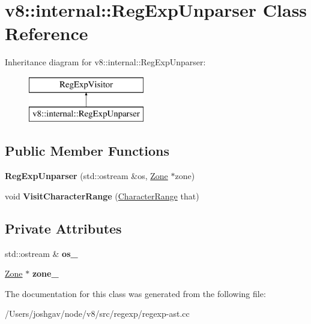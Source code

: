 \hypertarget{classv8_1_1internal_1_1_reg_exp_unparser}{}\section{v8\+:\+:internal\+:\+:Reg\+Exp\+Unparser Class Reference}
\label{classv8_1_1internal_1_1_reg_exp_unparser}
Inheritance diagram for v8\+:\+:internal\+:\+:Reg\+Exp\+Unparser\+:\begin{figure}[H]
\begin{center}
\leavevmode
\includegraphics[height=2.000000cm]{classv8_1_1internal_1_1_reg_exp_unparser}
\end{center}
\end{figure}
\subsection*{Public Member Functions}
\begin{DoxyCompactItemize}
\item 
{\bfseries Reg\+Exp\+Unparser} (std\+::ostream \&os, \hyperlink{classv8_1_1internal_1_1_zone}{Zone} $\ast$zone)\hypertarget{classv8_1_1internal_1_1_reg_exp_unparser_a173b4c3a192299699a7b990d77331078}{}\label{classv8_1_1internal_1_1_reg_exp_unparser_a173b4c3a192299699a7b990d77331078}

\item 
void {\bfseries Visit\+Character\+Range} (\hyperlink{classv8_1_1internal_1_1_character_range}{Character\+Range} that)\hypertarget{classv8_1_1internal_1_1_reg_exp_unparser_a96347cb8b81686a264858d55566f6244}{}\label{classv8_1_1internal_1_1_reg_exp_unparser_a96347cb8b81686a264858d55566f6244}

\end{DoxyCompactItemize}
\subsection*{Private Attributes}
\begin{DoxyCompactItemize}
\item 
std\+::ostream \& {\bfseries os\+\_\+}\hypertarget{classv8_1_1internal_1_1_reg_exp_unparser_a9cf44017440731a3e159d00936efaa92}{}\label{classv8_1_1internal_1_1_reg_exp_unparser_a9cf44017440731a3e159d00936efaa92}

\item 
\hyperlink{classv8_1_1internal_1_1_zone}{Zone} $\ast$ {\bfseries zone\+\_\+}\hypertarget{classv8_1_1internal_1_1_reg_exp_unparser_abf791af1ad63df0a514c651735a3c14f}{}\label{classv8_1_1internal_1_1_reg_exp_unparser_abf791af1ad63df0a514c651735a3c14f}

\end{DoxyCompactItemize}


The documentation for this class was generated from the following file\+:\begin{DoxyCompactItemize}
\item 
/\+Users/joshgav/node/v8/src/regexp/regexp-\/ast.\+cc\end{DoxyCompactItemize}
